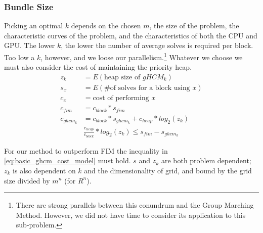 \documentclass[11pt]{article}       %
\begin{document}
\subsubsection{Bundle Size}\label{sec:bundle_size}
Picking an optimal $k$ depends on the chosen $m$, the size of the problem, the characteristic curves of the problem, and the characteristics of both the CPU and GPU. The lower $k$, the lower the number of average solves is required per block. Too low a $k$, however, and we loose our parallelism.\footnote{There are strong parallels between this conundrum and the Group Marching Method. However, we did not have time to consider its application to this sub-problem.} Whatever we choose we must also consider the cost of maintaining the priority heap.
\begin{equation} \label{eq:basic_ghcm_cost_model}
\begin{split}
z_k			&= E(\text{heap size of $gHCM_k$})					\\
s_x			&= E(\text{\# of solves for a block using $x$}) 	\\
c_x 		&= \text{cost of performing $x$}					\\
c_{fim}		&= c_{block} * s_{fim}								\\
c_{ghcm_k}	&= c_{block} * s_{ghcm_k} + c_{heap} * log_2(z_k)	\\
& \frac{c_{heap}}{c_{block}} * log_2(z_k) \le s_{fim} - s_{ghcm_k}
\end{split}
\end{equation}

For our method to outperform FIM the inequality in \autoref{eq:basic_ghcm_cost_model} must hold. $s$ and $z_k$ are both problem dependent; $z_k$ is also dependent on $k$ and the dimensionality of grid, and bound by the grid size divided by $m^n$ (for $R^n$).

\end{document}
